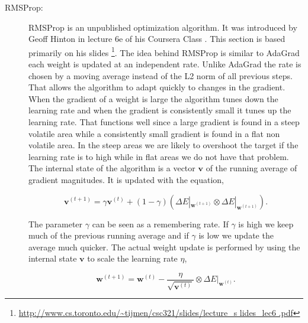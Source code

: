 \begin{description}

    \item[\gls{RMSProp}:]

        \gls{RMSProp} is an unpublished optimization algorithm.
        It was introduced by Geoff Hinton in lecture 6e of his
        Coursera Class \citep{DBLP:journals/corr/Ruder16}.
        This section is based primarily on his slides
        \footnote{\url{http://www.cs.toronto.edu/~tijmen/csc321/slides/lecture_s
        lides_lec6 .pdf}}. The idea behind \gls{RMSProp} is similar to
        \gls{AdaGrad} each weight is updated at an independent rate. Unlike
        \gls{AdaGrad} the rate is chosen by a moving average instead of the
        L2 norm of all previous steps. That allows the algorithm to adapt
        quickly to changes in the gradient. When the gradient of a weight is
        large the algorithm tunes down the learning rate and when the gradient
        is consistently small it tunes up the learning rate. That functions
        well since a large gradient is found in a steep volatile area while a
        consistently small gradient is found in a flat non volatile area. In the
        steep areas we are likely to overshoot the target if the learning rate
        is to high while in flat areas we do not have that problem. The internal
        state of the algorithm is a vector $\mathbf{v}$ of the running average
        of gradient magnitudes. It is updated with the equation,

        \begin{equation}
            \label{eq:rms_prop_state}
            \mathbf{v}^{(t+1)} =
                \gamma\mathbf{v}^{(t)} +
                (1 - \gamma)\left(
                    \Delta E|_{\mathbf{w}^{(t + 1)}} \otimes
                    \Delta E|_{\mathbf{w}^{(t + 1)}}
                \right).
        \end{equation}

        The parameter $\gamma$ can be seen as a remembering rate. If $\gamma$
        is high we keep much of the previous running average and if $\gamma$
        is low we update the average much quicker. The actual weight update is
        performed by using the internal state $\mathbf{v}$ to scale the learning
        rate $\eta$,

        \begin{equation}
            \mathbf{w}^{(t+1)} =
                \mathbf{w}^{(t)} -
                \frac{\eta}{\sqrt{\mathbf{v}^{(t)}}} \otimes
                \Delta E|_{\mathbf{w}^{(t)}}.
        \end{equation}


\end{description}
